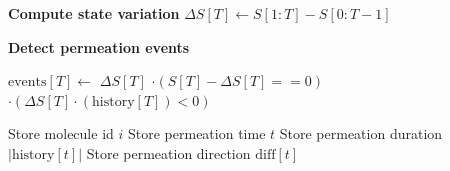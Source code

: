 \documentclass{article}
\begin{document}
\begin{algorithm}
\begin{algorithmic}[1]
            \State \textbf{Compute state variation}
            \State \( \Delta S[T] \gets S[1:T] - S[0:T-1] \)
    
            \State \textbf{Detect permeation events}

            \State \( \text{events}[T] \gets \) 
            \State \( \Delta S[T] \) 
            \State \( \cdot (S[T] - \Delta S[T] == 0) \) 
            \State \(\cdot (\Delta S[T] \cdot (\text{history}[T])< 0) \) 
    
                 
                    \State Store molecule id \( i \)
                    \State Store permeation time \( t \)
                    \State Store permeation duration \( |\text{history}[t]| \)
                    \State Store permeation direction \( \text{diff}[t] \)
                \EndIf
            \EndFor
        \EndFor
    \EndFor
    
    \end{algorithmic}
\end{algorithm}
\end{document}
